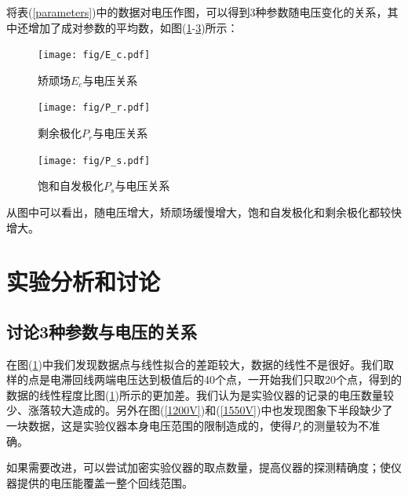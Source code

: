\documentclass[a4paper]{article}
\begin{document}
将表(\ref{parameters})中的数据对电压作图，可以得到3种参数随电压变化的关系，其中还增加了成对参数的平均数，如图(\ref{E_c}-\ref{P_s})所示：
\begin{figure}[!h]
    \centering
    \texttt{[image: fig/E\_c.pdf]}
    \caption{矫顽场$E_c$与电压关系}\label{E_c}
\end{figure}

\begin{figure}[!h]
    \centering
    \texttt{[image: fig/P\_r.pdf]}
    \caption{剩余极化$P_r$与电压关系}\label{P_r}
\end{figure}

\begin{figure}[!h]
    \centering
    \texttt{[image: fig/P\_s.pdf]}
    \caption{饱和自发极化$P_s$与电压关系}\label{P_s}
\end{figure}

从图中可以看出，随电压增大，矫顽场缓慢增大，饱和自发极化和剩余极化都较快增大。

\newpage
\phantom{something}
\newpage

\section{实验分析和讨论}
\subsection{讨论3种参数与电压的关系}
在图(\ref{E_c})中我们发现数据点与线性拟合的差距较大，数据的线性不是很好。我们取样的点是电滞回线两端电压达到极值后的40个点，一开始我们只取20个点，得到的数据的线性程度比图(\ref{E_c})所示的更加差。我们认为是实验仪器的记录的电压数量较少、涨落较大造成的。另外在图(\ref{1200V})和(\ref{1550V})中也发现图象下半段缺少了一块数据，这是实验仪器本身电压范围的限制造成的，使得$P_r$的测量较为不准确。

如果需要改进，可以尝试加密实验仪器的取点数量，提高仪器的探测精确度；使仪器提供的电压能覆盖一整个回线范围。
\end{document}
